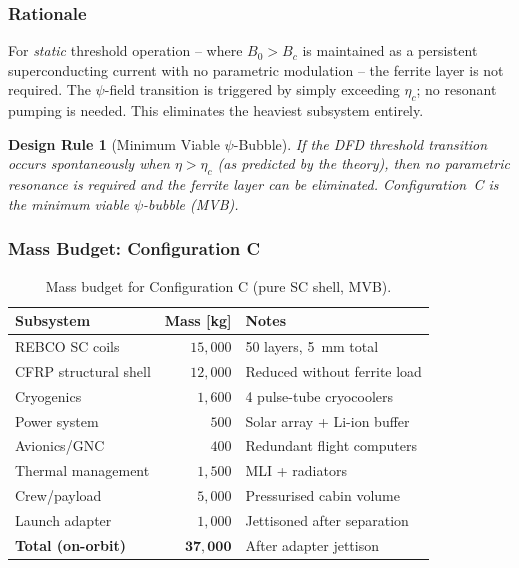 \documentclass[11pt,a4paper]{article}
\newtheorem{designrule}{Design Rule}
\begin{document}
\subsubsection{Rationale}

For \emph{static} threshold operation -- where $B_0 > B_c$ is maintained as a
persistent superconducting current with no parametric modulation -- the ferrite
layer is not required. The $\psi$-field transition is triggered by simply
exceeding $\eta_c$; no resonant pumping is needed. This eliminates the heaviest
subsystem entirely.

\begin{designrule}[Minimum Viable $\psi$-Bubble]
If the DFD threshold transition occurs spontaneously when $\eta > \eta_c$
(as predicted by the theory), then no parametric resonance is required and
the ferrite layer can be eliminated. Configuration~C is the minimum viable
$\psi$-bubble (MVB).
\end{designrule}

\subsubsection{Mass Budget: Configuration C}

\begin{table}[h]
\centering
\caption{Mass budget for Configuration C (pure SC shell, MVB).}
\label{tab:mass_C}
\begin{tabular}{@{}lrl@{}}
\toprule
Subsystem & Mass [\si{kg}] & Notes \\
\midrule
REBCO SC coils & $15{,}000$ & 50 layers, \SI{5}{mm} total \\
CFRP structural shell & $12{,}000$ & Reduced without ferrite load \\
Cryogenics & $1{,}600$ & 4 pulse-tube cryocoolers \\
Power system & $500$ & Solar array + Li-ion buffer \\
Avionics/GNC & $400$ & Redundant flight computers \\
Thermal management & $1{,}500$ & MLI + radiators \\
Crew/payload & $5{,}000$ & Pressurised cabin volume \\
Launch adapter & $1{,}000$ & Jettisoned after separation \\
\midrule
\textbf{Total (on-orbit)} & $\mathbf{37{,}000}$ & After adapter jettison \\
\bottomrule
\end{tabular}
\end{table}
\end{document}
